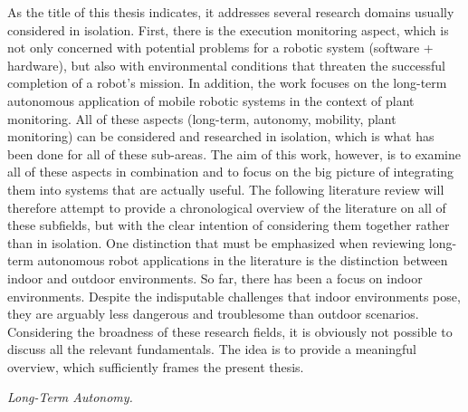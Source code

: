\documentclass[english, master, utf8]{base/thesis_KBS}
\begin{document}
As the title of this thesis indicates, it addresses several research domains usually considered in isolation. First, there is the execution monitoring aspect, which is not only
concerned with potential problems for a robotic system (software + hardware), but also with environmental conditions that threaten the successful completion of a robot's mission.
In addition, the work focuses on the long-term autonomous application of mobile robotic systems in the context of plant monitoring. All of these aspects (long-term, autonomy,
mobility, plant monitoring) can be considered and researched in isolation, which is what has been done for all of these sub-areas. The aim of this work, however, is to examine all of
these aspects in combination and to focus on the big picture of integrating them into systems that are actually useful. The following literature review will therefore attempt to
provide a chronological overview of the literature on all of these subfields, but with the clear intention of considering them together rather than in isolation.
One distinction that must be emphasized when reviewing long-term autonomous robot applications in the literature is the distinction between indoor and outdoor environments.
So far, there has been a focus on indoor environments. \cite{Kyberd:2021} Despite the indisputable challenges that indoor environments pose, they are arguably less dangerous and
troublesome than outdoor scenarios. \cite{Hawes:2017} Considering the broadness of these research fields, it is obviously not possible to discuss all the relevant fundamentals.
The idea is to provide a meaningful overview, which sufficiently frames the present thesis.\newline

\noindent
\textit{Long-Term Autonomy.}\newline
\end{document}
